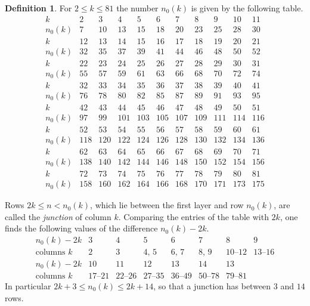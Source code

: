 \documentclass{amsart}
\theoremstyle{definition}
\newtheorem{definition}[theorem]{Definition}
\theoremstyle{remark}
\numberwithin{equation}{section}
\begin{document}
\begin{definition}\label{def:junctionrows}
For $2\le k\le81$ the number $n_0(k)$ is given by the following table.
\[
\begin{array}{r|cccccccccc}
k & 2 & 3 & 4 & 5 & 6 & 7 & 8 & 9 & 10 & 11\\
n_0(k) & 7 & 10 & 13 & 15 & 18 & 20 & 23 & 25 & 28 & 30\\
\hline
k & 12 & 13 & 14 & 15 & 16 & 17 & 18 & 19 & 20 & 21\\
n_0(k) & 32 & 35 & 37 & 39 & 41 & 44 & 46 & 48 & 50 & 52\\
\hline
k & 22 & 23 & 24 & 25 & 26 & 27 & 28 & 29 & 30 & 31\\
n_0(k) & 55 & 57 & 59 & 61 & 63 & 66 & 68 & 70 & 72 & 74\\
\hline
k & 32 & 33 & 34 & 35 & 36 & 37 & 38 & 39 & 40 & 41\\
n_0(k) & 76 & 78 & 80 & 82 & 85 & 87 & 89 & 91 & 93 & 95\\
\hline
k & 42 & 43 & 44 & 45 & 46 & 47 & 48 & 49 & 50 & 51\\
n_0(k) & 97 & 99 & 101 & 103 & 105 & 107 & 109 & 111 & 114 & 116\\
\hline
k & 52 & 53 & 54 & 55 & 56 & 57 & 58 & 59 & 60 & 61\\
n_0(k) & 118 & 120 & 122 & 124 & 126 & 128 & 130 & 132 & 134 & 136\\
\hline
k & 62 & 63 & 64 & 65 & 66 & 67 & 68 & 69 & 70 & 71\\
n_0(k) & 138 & 140 & 142 & 144 & 146 & 148 & 150 & 152 & 154 & 156\\
\hline
k & 72 & 73 & 74 & 75 & 76 & 77 & 78 & 79 & 80 & 81\\
n_0(k) & 158 & 160 & 162 & 164 & 166 & 168 & 170 & 171 & 173 & 175
\end{array}
\]
\end{definition}

Rows $2k\le n<n_0(k)$, which lie between the first layer and row
$n_0(k)$, are called the \emph{junction} of column $k$. Comparing the
entries of the table with $2k$, one finds the following values of the
difference $n_0(k)-2k$.
\[
\begin{array}{r|ccccccc}
n_0(k)-2k & 3 & 4 & 5 & 6 & 7 & 8 & 9\\
\text{columns $k$} & 2 & 3 & 4,\,5 & 6,\,7 & 8,\,9 & 10\text{--}12
 & 13\text{--}16\\
\hline
n_0(k)-2k & 10 & 11 & 12 & 13 & 14 & 13 & \\
\text{columns $k$} & 17\text{--}21 & 22\text{--}26 & 27\text{--}35
 & 36\text{--}49 & 50\text{--}78 & 79\text{--}81 &
\end{array}
\]
In particular $2k+3\le n_0(k)\le2k+14$, so that a junction has between $3$
and $14$ rows.
\end{document}
